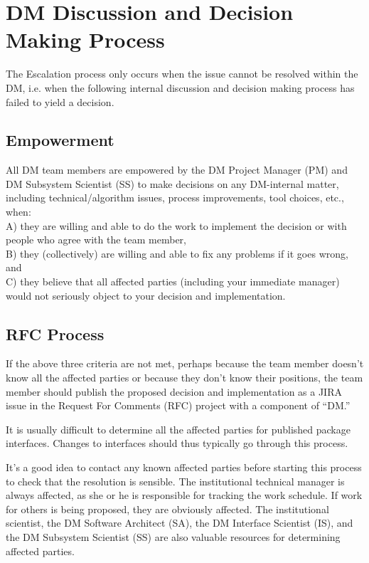 \section{DM Discussion and Decision Making Process}

The Escalation process only occurs when the issue cannot be resolved within the DM, i.e. when the following internal discussion and decision making process has failed to yield a decision.
\subsection{Empowerment}
All DM team members are empowered by the DM Project Manager (PM) and DM Subsystem  Scientist (SS) to make decisions on any DM-internal matter, including technical/algorithm issues, process improvements, tool choices, etc., when:\\
A) they are willing and able to do the work to implement the decision or with people who agree with the team member,\\
B) they (collectively) are willing and able to fix any problems if it goes wrong, and\\
C) they believe that all affected parties (including your immediate manager) would not seriously object to your decision and implementation.\\

\subsection{RFC Process}
If the above three criteria are not met, perhaps because the team member doesn't know all the affected parties or because they don't know their positions, the team member should publish the proposed decision and implementation as a JIRA issue in the Request For Comments (RFC) project with a component of ``DM.''

It is usually difficult to determine all the affected parties for published package interfaces. Changes to interfaces should thus typically go through this process.

It's a good idea to contact any known affected parties before starting this process to check that the resolution is sensible. The institutional technical manager is always affected, as she or he is responsible for tracking the work schedule. If work for others is being proposed, they are obviously affected. The institutional scientist, the DM Software Architect (SA), the DM Interface Scientist (IS), and the DM Subsystem  Scientist (SS) are also valuable resources for determining affected parties.

